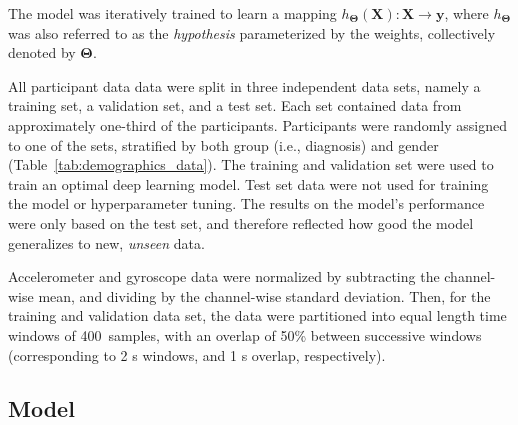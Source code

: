 \documentclass[sensors,article,submit,pdftex,moreauthors]{Definitions/mdpi}
\begin{document}
The model was iteratively trained to learn a mapping $h_{\mathbf{\Theta}}(\mathbf{X}): \mathbf{X} \rightarrow \mathbf{y}$, where $h_{\mathbf{\Theta}}$ was also referred to as the \emph{hypothesis} parameterized by the weights, collectively denoted by $\mathbf{\Theta}$.

All participant data data were split in three independent data sets, namely a training set, a validation set, and a test set. Each set contained data from approximately one-third of the participants. Participants were randomly assigned to one of the sets, stratified by both group (i.e., diagnosis) and gender (Table~\ref{tab:demographics_data}). The training and validation set were used to train an optimal deep learning model. Test set data were not used for training the model or hyperparameter tuning. The results on the model's performance were only based on the test set, and therefore reflected how good the model generalizes to new, \emph{unseen} data.

Accelerometer and gyroscope data were normalized by subtracting the channel-wise mean, and dividing by the channel-wise standard deviation. Then, for the training and validation data set, the data were partitioned into equal length time windows \cite{Filtjens2020} of 400~samples, with an overlap of 50\% between successive windows (corresponding to 2 s windows, and 1 s overlap, respectively).

\subsection{Model}
\end{document}
